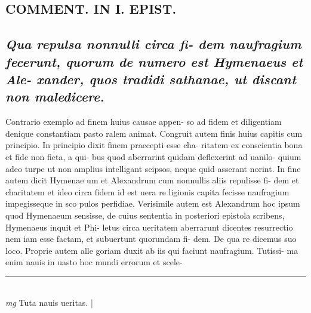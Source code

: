 \documentclass{article}
\begin{document}
\begin{pages}
\section*{COMMENT. IN I. EPIST. }
{}
\subsection*{\textit{Qua repulsa nonnulli circa fi- dem naufragium fecerunt, quorum de numero est Hymenaeus et Ale- xander, quos tradidi sathanae, ut discant non maledicere. }}\pstart Contrario exemplo ad finem huius causae appen- so ad fidem et diligentiam denique constantiam pasto ralem animat. Congruit autem finis huius capitis cum principio. In principio dixit finem praecepti esse cha- ritatem ex conscientia bona et fide non ficta, a qui- bus quod aberrarint quidam deflexerint ad uanilo- quium adeo turpe ut non amplius intelligant seipsos, neque quid asserant norint. In fine autem dicit Hymenae um et Alexandrum cum nonnullis aliis repulisse fi- dem et charitatem et ideo circa fidem id est uera re ligionis capita fecisse naufragium impegisseque in sco pulos perfidiae. Verisimile autem est Alexandrum hoc ipsum quod Hymenaeum sensisse, de cuius sententia in posteriori epistola scribens, Hymenaeus inquit et Phi- letus circa ueritatem aberrarunt dicentes resurrectio nem iam esse factam, et subuertunt quorundam fi- dem. De qua re dicemus suo loco. Proprie autem alle goriam duxit ab iis qui faciunt naufragium. Tutissi- ma enim nauis in uasto hoc mundi errorum et scele-  \pend
\vspace{0.5cm}\noindent
\vspace{0.2cm}\rule{1cm}{0.2pt}\\ 
\hspace{0.2cm}\textit{mg}
\footnotesize Tuta nauis ueritas. 
\normalsize| 

\end{pages}
\end{document}
